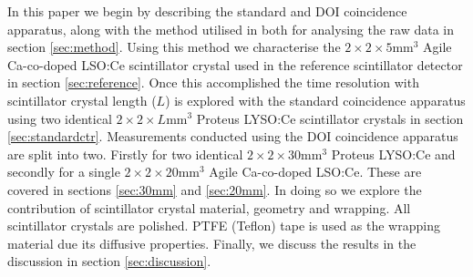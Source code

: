 In this paper we begin by describing the standard and DOI coincidence apparatus, along with the method utilised in both for analysing the raw data in section \ref{sec:method}. Using this method we characterise the $2\times2\times5$mm$^3$ Agile Ca-co-doped LSO:Ce scintillator crystal used in the reference scintillator detector in section \ref{sec:reference}. Once this accomplished the time resolution with scintillator crystal length ($L$) is explored with the standard coincidence apparatus using two identical $2\times2\times L$mm$^3$ Proteus LYSO:Ce scintillator crystals in section \ref{sec:standardctr}. Measurements conducted using the DOI coincidence apparatus are split into two. Firstly for two identical $2\times2\times30$mm$^3$ Proteus LYSO:Ce and secondly for a single $2\times2\times20$mm$^3$ Agile Ca-co-doped LSO:Ce. These are covered in sections \ref{sec:30mm} and \ref{sec:20mm}. In doing so we explore the contribution of scintillator crystal material, geometry and wrapping. All scintillator crystals are polished. PTFE (Teflon) tape is used as the wrapping material due its diffusive properties. Finally, we discuss the results in the discussion in section \ref{sec:discussion}.
